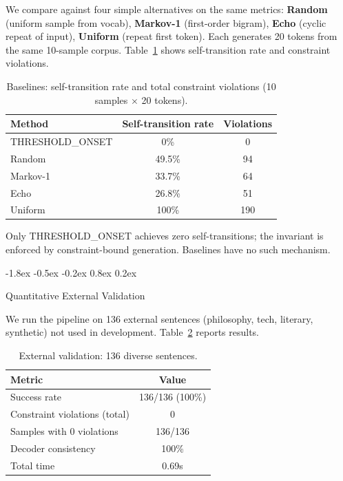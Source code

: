 \documentclass[10pt]{article}
\makeatletter
\renewcommand{\subsection}{\@startsection{subsection}{2}{\z@}%
  {-1.8ex \@plus -0.5ex \@minus -0.2ex}%
  {0.8ex \@plus 0.2ex}%
  {\normalsize\bfseries\raggedright}}
\makeatother
\begin{document}
We compare against four simple alternatives on the same metrics: \textbf{Random} (uniform sample from vocab), \textbf{Markov-1} (first-order bigram), \textbf{Echo} (cyclic repeat of input), \textbf{Uniform} (repeat first token). Each generates 20 tokens from the same 10-sample corpus. Table~\ref{tab:baselines} shows self-transition rate and constraint violations.

\begin{table}[t]
\centering
\caption{Baselines: self-transition rate and total constraint violations (10 samples $\times$ 20 tokens).}
\label{tab:baselines}
\begin{tabular}{lcc}
\toprule
\textbf{Method} & \textbf{Self-transition rate} & \textbf{Violations} \\
\midrule
THRESHOLD\_ONSET & 0\% & 0 \\
Random & 49.5\% & 94 \\
Markov-1 & 33.7\% & 64 \\
Echo & 26.8\% & 51 \\
Uniform & 100\% & 190 \\
\bottomrule
\end{tabular}
\end{table}

Only THRESHOLD\_ONSET achieves zero self-transitions; the invariant is enforced by constraint-bound generation. Baselines have no such mechanism.

\subsection{Quantitative External Validation}

We run the pipeline on 136 external sentences (philosophy, tech, literary, synthetic) not used in development. Table~\ref{tab:external} reports results.

\begin{table}[t]
\centering
\caption{External validation: 136 diverse sentences.}
\label{tab:external}
\begin{tabular}{lc}
\toprule
\textbf{Metric} & \textbf{Value} \\
\midrule
Success rate & 136/136 (100\%) \\
Constraint violations (total) & 0 \\
Samples with 0 violations & 136/136 \\
Decoder consistency & 100\% \\
Total time & 0.69s \\
\bottomrule
\end{tabular}
\end{table}
\end{document}
